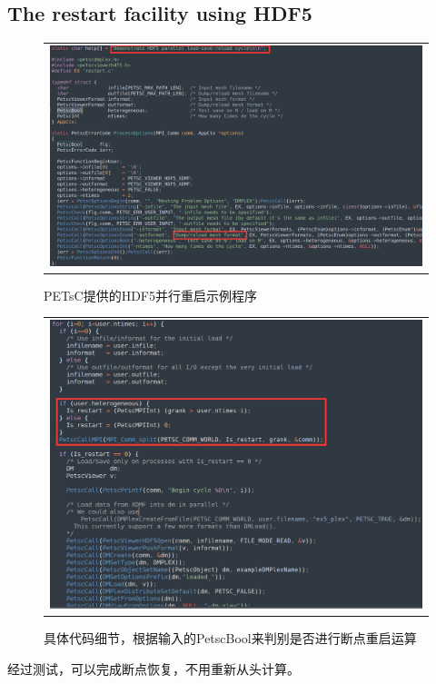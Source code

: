 \documentclass[3p]{elsarticle}
\numberwithin{equation}{section}
\begin{document}
    \clearpage

    \subsection{The restart facility using HDF5}
    
    \begin{figure}[h]
    	\begin{center}
    		\begin{tabular}{c}
    			\includegraphics[angle=0, scale=0.16]{./figures/restart.png}
    		\end{tabular}
    	\end{center}
    	\caption{PETsC提供的HDF5并行重启示例程序}
    	\label{fig:illustration-restart}
    \end{figure}
    
    
    \begin{figure}[h]
    	\begin{center}
    		\begin{tabular}{c}
    			\includegraphics[angle=0, scale=0.16]{./figures/restart1.png}
    		\end{tabular}
    	\end{center}
    	\caption{具体代码细节，根据输入的PetscBool来判别是否进行断点重启运算}
    	\label{fig:illustration-restart1}
    \end{figure}
    经过测试，可以完成断点恢复，不用重新从头计算。
    \clearpage
\end{document}
